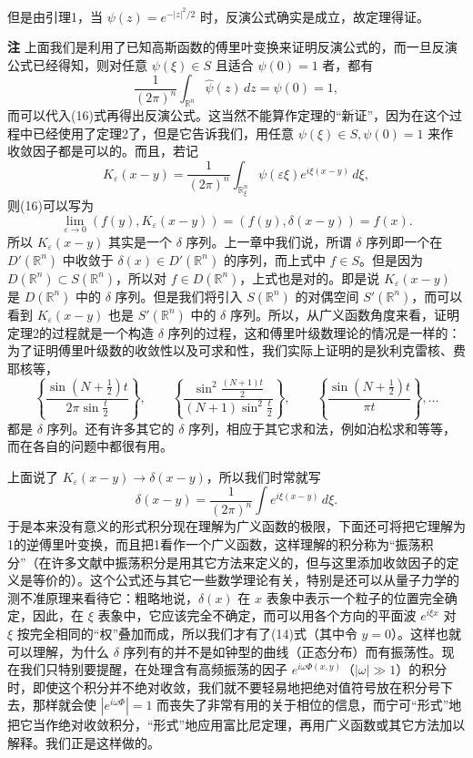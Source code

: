 但是由引理1，当 $\psi(z)=e^{-|z|^2/2}$ 时，反演公式确实是成立，故定理得证。

\noindent\textbf{注}\quad
上面我们是利用了已知高斯函数的傅里叶变换来证明反演公式的，而一旦反演公式已经得知，则对任意 $\psi(\xi)\in S$ 且适合 $\psi(0)=1$ 者，都有
\[
 \frac1{(2\pi)^n}\int_{\mathbb R^n}\widehat\psi(z)\,dz=\psi(0)=1,
\]
而可以代入(16)式再得出反演公式。这当然不能算作定理的“新证”，因为在这个过程中已经使用了定理2了，但是它告诉我们，用任意 $\psi(\xi)\in S,\psi(0)=1$ 来作收敛因子都是可以的。而且，若记
\[
 K_\varepsilon(x-y)=\frac1{(2\pi)^n}\int_{\mathbb R^n_\xi}\psi(\varepsilon\xi)e^{i\xi(x-y)}\,d\xi,
\]
则(16)可以写为
\[
 \lim_{\varepsilon\to0}(f(y),K_\varepsilon(x-y))=(f(y),\delta(x-y))=f(x).
\]
所以 $K_\varepsilon(x-y)$ 其实是一个 $\delta$ 序列。上一章中我们说，所谓 $\delta$ 序列即一个在 $D'(\mathbb R^n)$ 中收敛于 $\delta(x)\in D'(\mathbb R^n)$ 的序列，而上式中 $f\in S$。但是因为 $D(\mathbb R^n)\subset S(\mathbb R^n)$，所以对 $f\in D(\mathbb R^n)$，上式也是对的。即是说 $K_\varepsilon(x-y)$ 是 $D(\mathbb R^n)$ 中的 $\delta$ 序列。但是我们将引入 $S(\mathbb R^n)$ 的对偶空间 $S'(\mathbb R^n)$，而可以看到 $K_\varepsilon(x-y)$ 也是 $S'(\mathbb R^n)$ 中的 $\delta$ 序列。所以，从广义函数角度来看，证明定理2的过程就是一个构造 $\delta$ 序列的过程，这和傅里叶级数理论的情况是一样的：为了证明傅里叶级数的收敛性以及可求和性，我们实际上证明的是狄利克雷核、费耶核等，
\[
 \left\{\frac{\sin(N+\frac12)t}{2\pi\sin\frac t2}\right\},\qquad
 \left\{\frac{\sin^2\frac{(N+1)t}{2}}{(N+1)\sin^2\frac t2}\right\},\qquad
 \left\{\frac{\sin(N+\frac12)t}{\pi t}\right\},\ldots
\]
都是 $\delta$ 序列。还有许多其它的 $\delta$ 序列，相应于其它求和法，例如泊松求和等等，而在各自的问题中都很有用。

上面说了 $K_\varepsilon(x-y)\to\delta(x-y)$，所以我们时常就写
\[
 \delta(x-y)=\frac1{(2\pi)^n}\int e^{i\xi(x-y)}\,d\xi.
\]
于是本来没有意义的形式积分现在理解为广义函数的极限，下面还可将把它理解为1的逆傅里叶变换，而且把1看作一个广义函数，这样理解的积分称为“振荡积分”（在许多文献中振荡积分是用其它方法来定义的，但与这里添加收敛因子的定义是等价的）。这个公式还与其它一些数学理论有关，特别是还可以从量子力学的测不准原理来看待它：粗略地说，$\delta(x)$ 在 $x$ 表象中表示一个粒子的位置完全确定，因此，在 $\xi$ 表象中，它应该完全不确定，而可以用各个方向的平面波 $e^{i\xi x}$ 对 $\xi$ 按完全相同的“权”叠加而成，所以我们才有了(14)式（其中令 $y=0$）。这样也就可以理解，为什么 $\delta$ 序列有的并不是如钟型的曲线（正态分布）而有振荡性。现在我们只特别要提醒，在处理含有高频振荡的因子 $e^{i\omega\Phi(x,y)}$（$|\omega|\gg1$）的积分时，即使这个积分并不绝对收敛，我们就不要轻易地把绝对值符号放在积分号下去，那样就会使 $|e^{i\omega\Phi}|=1$ 而丧失了非常有用的关于相位的信息，而宁可“形式”地把它当作绝对收敛积分，“形式”地应用富比尼定理，再用广义函数或其它方法加以解释。我们正是这样做的。

